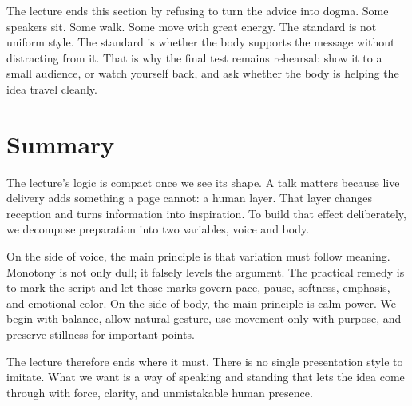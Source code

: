 The lecture ends this section by refusing to turn the advice into dogma. Some speakers sit. Some walk. Some move with great energy. The standard is not uniform style. The standard is whether the body supports the message without distracting from it. That is why the final test remains rehearsal: show it to a small audience, or watch yourself back, and ask whether the body is helping the idea travel cleanly.

\section{Summary}

The lecture's logic is compact once we see its shape. A talk matters because live delivery adds something a page cannot: a human layer. That layer changes reception and turns information into inspiration. To build that effect deliberately, we decompose preparation into two variables, voice and body.

On the side of voice, the main principle is that variation must follow meaning. Monotony is not only dull; it falsely levels the argument. The practical remedy is to mark the script and let those marks govern pace, pause, softness, emphasis, and emotional color. On the side of body, the main principle is calm power. We begin with balance, allow natural gesture, use movement only with purpose, and preserve stillness for important points.

The lecture therefore ends where it must. There is no single presentation style to imitate. What we want is a way of speaking and standing that lets the idea come through with force, clarity, and unmistakable human presence.